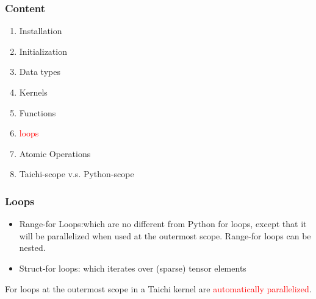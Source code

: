 \documentclass[serif,mathserif]{beamer}
\begin{document}
\begin{CJK}{UTF8}{gbsn}
\begin{frame}

  
\end{frame}

\begin{frame}
  \frametitle{Content}
  \begin{enumerate}
  \item Installation
  \item Initialization
  \item Data types
  \item Kernels
  \item Functions
  \item \textcolor{red}{loops}
  \item Atomic Operations
  \item Taichi-scope v.s. Python-scope
  \end{enumerate}
\end{frame}

\begin{frame}
  \frametitle{Loops}
  \begin{itemize}
  \item Range-for Loops:which are no different from Python for loops, except that it will be parallelized when used at the outermost scope. Range-for loops can be nested.\newline
  \item Struct-for loops: which iterates over (sparse) tensor elements\newline
  \end{itemize}

  For loops at the outermost scope in a Taichi kernel are \textcolor{red}{automatically parallelized}.\newline\newline
\end{frame}


\end{CJK}
\end{document}

